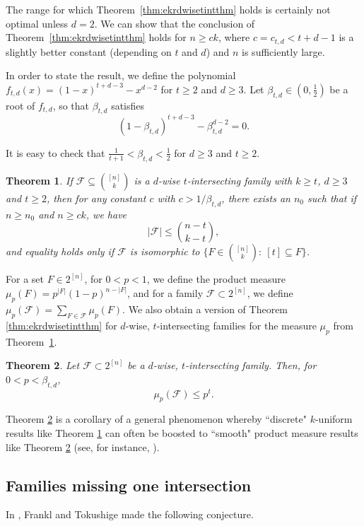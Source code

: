 \documentclass[12pt]{article}
\newtheorem{theorem}{Theorem}
\theoremstyle{definition}
\newcommand{\cF}{\mathcal{F}}
\begin{document}
The range for which Theorem~\ref{thm:ekrdwisetintthm} holds is certainly not optimal unless $d=2$. We can show that the conclusion of Theorem~\ref{thm:ekrdwisetintthm} holds for $n \ge ck$, where $c = c_{t, d} < t+d-1$ is a slightly better constant (depending on $t$ and $d$) and $n$ is sufficiently large. 

In order to state the result, we define the polynomial $f_{t, d}(x) = (1-x)^{t+d-3} - x^{d-2}$ for $t\ge 2$ and $d\ge 3$. Let $\beta_{t, d} \in (0, \frac12)$ be a root of $f_{t, d}$, so that $\beta_{t, d}$ satisfies
\begin{equation}\label{eqn:betaeqn}
(1-\beta_{t, d})^{t+d-3} - \beta_{t, d}^{d-2} = 0.
\end{equation}

It is easy to check that $\frac{1}{t+1} < \beta_{t, d} < \frac12$ for $d\ge 3$ and $t\ge 2$.  

\begin{theorem}\label{thm:improvedekrdwisetintthm}
If $\cF\subseteq \binom{[n]}{k}$ is a $d$-wise $t$-intersecting family with $k\ge t$, $d\ge 3$ and $t\ge 2$, then for any constant $c$ with $c > 1/\beta_{t, d}$, there exists an $n_0$ such that if $n \ge n_0$ and $n \ge c k$, we have
\[|\cF| \le \binom{n-t}{k-t},\]
and equality holds only if $\cF$ is isomorphic to $\{F \in \binom{[n]}{k}:\ [t] \subseteq F\}$.
\end{theorem}

For a set $F\in 2^{[n]}$, for $0 < p < 1$, we define the product measure $\mu_p(F) = p^{|F|}(1-p)^{n - |F|}$, and for a family $\cF \subset 2^{[n]}$, we define $\mu_p(\cF) = \sum_{F\in \cF}\mu_p(F)$. We also obtain a version of Theorem \ref{thm:ekrdwisetintthm} for $d$-wise, $t$-intersecting families for the measure $\mu_p$ from Theorem~\ref{thm:improvedekrdwisetintthm}. 

\begin{theorem}\label{thm:pekrdwisetintthm}
Let $\cF \subset 2^{[n]}$ be a $d$-wise, $t$-intersecting family. Then, for $0 < p < \beta_{t, d}$, 
\[\mu_p(\cF) \le p^t.\]
\end{theorem}

Theorem \ref{thm:pekrdwisetintthm} is a corollary of a general phenomenon whereby ``discrete" $k$-uniform results like Theorem \ref{thm:improvedekrdwisetintthm} can often be boosted to ``smooth" product measure results like Theorem \ref{thm:pekrdwisetintthm} (see, for instance, \cite{Tok1}). 

\subsection{Families missing one intersection}
In \cite[pg.~215]{FT}, Frankl and Tokushige made the following conjecture.
\end{document}
